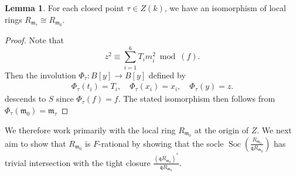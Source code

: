 \documentclass[reqno,11pt]{amsart}
\numberwithin{equation}{section}
\theoremstyle{definition}
\theoremstyle{definition}
\newtheorem{lemma}[theorem]{Lemma}
\theoremstyle{definition}
\theoremstyle{remark}
\newcommand{\Soc}{\operatorname{Soc}}
\newcommand{\fm}{\mathfrak{m}}
\newcommand{\fq}{\mathfrak{q}}
\begin{document}
\begin{lemma}\label{lem: closed-point-isomorphism}
    For each closed point $\tau\in Z(k)$, we have an isomorphism of local rings $R_{\fm_\tau}\cong R_{\fm_0}$.
\end{lemma}
\begin{proof}
    Note that $$z^2\equiv \sum\limits_{i=1}^6 T_i m_i^2\bmod (f).$$ Then the involution $\Phi_\tau:B[y]\to B[y]$ defined by
    \begin{align*}
        \Phi_{\tau}(t_i)=T_i,\quad \Phi_{\tau}(x_i)=x_i,\quad \Phi_{\tau}(y)=z.
    \end{align*}
    descends to $S$ since $\Phi_\tau(f)=f$. The stated isomorphism then follows from $\Phi_\tau(\fm_0)=\fm_\tau$
\end{proof}
We therefore work primarily with the local ring $R_{\fm_0}$ at the origin of $Z$. We next aim to show that $R_{\fm_0}$ is $F$-rational by showing that the socle $\Soc\left(\frac{R_{\fm_0}}{\fq R_{\fm_0}}\right)$ has trivial intersection with the tight closure $\frac{(\fq R_{\fm_0})^*}{\fq R_{\fm_0}}$.
\end{document}
